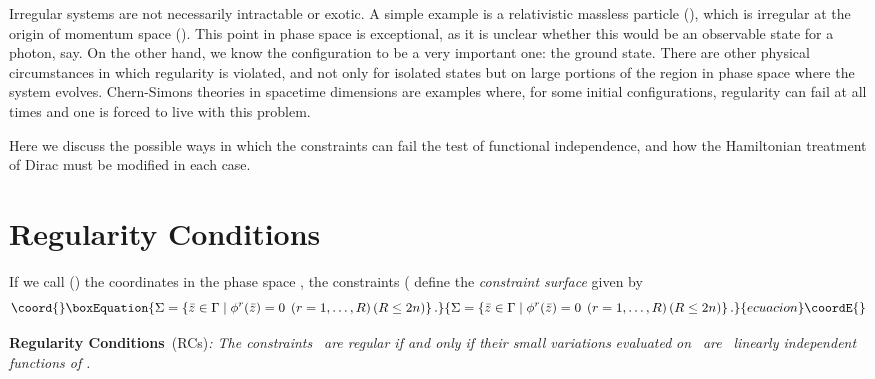 \documentclass[a4paper,thmsa,11pt]{article}
\begin{document}
Irregular systems are not necessarily intractable or exotic. A simple
example is a relativistic massless particle (\coordHE{}), which is
irregular at the origin of momentum space (\coordHE{}). This point in
phase space is exceptional, as it is unclear whether this would be an
observable state for a photon, say. On the other hand, we know the
configuration \coordHE{} to be a very important one: the ground state.
There are other physical circumstances in which regularity is violated, and
not only for isolated states but on large portions of the region in phase
space where the system evolves. Chern-Simons theories in \coordHE{} spacetime
dimensions are examples where, for some initial configurations, regularity
can fail at all times and one is forced to live with this problem.

Here we discuss the possible ways in which the constraints can fail the test
of functional independence, and how the Hamiltonian treatment of Dirac must
be modified in each case.


\section{Regularity Conditions}

If we call \coordHE{} (\coordHE{}) the coordinates in the
phase space \myHighlight{$\Gamma $}\coordHE{}, the constraints \coordHE{} (\coordHE{}
define the \emph{constraint surface} \myHighlight{$\Sigma $}\coordHE{} given by
\begin{equation}\coord{}\boxEquation{
\Sigma =\left\{ \bar{z}\in \Gamma \mid \phi ^{r}(\bar{z})=0\;\left(
r=1,\ldots ,R\right) \left( R\leq 2n\right) \right\} .
}{
\Sigma =\left\{ \bar{z}\in \Gamma \mid \phi ^{r}(\bar{z})=0\;\left(
r=1,\ldots ,R\right) \left( R\leq 2n\right) \right\} .
}{ecuacion}\coordE{}\end{equation}

\textbf{Regularity Conditions}\emph{\ }(RCs)\emph{: The constraints }\coordHE{}\emph{\ are regular if and only if their small variations }\coordHE{} \emph{evaluated} \emph{on }\myHighlight{$\Sigma \emph{,}$}\coordHE{}\emph{%
\ are }\coordHE{}\emph{\ linearly independent functions of }\coordHE{}\emph{.}%
\medskip
\end{document}
